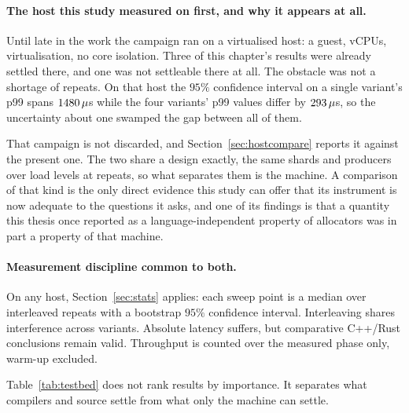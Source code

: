 \documentclass[english,oneside,a4paper,censored,csm,software-track-2020]{HYthesisML}
\begin{document}
\paragraph{The host this study measured on first, and why it appears at all.}
Until late in the work the campaign ran on a virtualised host: a \GuestCpu{} guest,
\GuestCores{} vCPUs, \GuestVirt{} virtualisation, no core isolation. Three of this chapter's
results were already settled there, and one was not settleable there at all. The obstacle was not
a shortage of repeats. On that host the $95\%$ confidence interval on a single variant's p99 spans
$1480\,\mu$s while the four variants' p99 values differ by
$293\,\mu$s, so the uncertainty about one swamped the gap between all of them.

That campaign is not discarded, and Section~\ref{sec:hostcompare} reports it against the present
one. The two share a design exactly, the same \GuestShards{} shards and \GuestProducers{}
producers over \GuestLoadLevels{} load levels at \GuestRepeats{} repeats, so what separates them is
the machine. A comparison of that kind is the only direct evidence this study can offer that its
instrument is now adequate to the questions it asks, and one of its findings is that a quantity
this thesis once reported as a language-independent property of allocators was in part a property
of that machine.

\paragraph{Measurement discipline common to both.}
On any host, Section~\ref{sec:stats} applies: each sweep point is a median over \NRepeats{}
interleaved repeats with a bootstrap $95\%$ confidence interval. Interleaving shares interference
across variants. Absolute latency suffers, but comparative C++/Rust conclusions remain valid.
Throughput is counted over the measured phase only, warm-up excluded.

Table~\ref{tab:testbed} does not rank results by importance. It separates what compilers and
source settle from what only the machine can settle.
\end{document}
